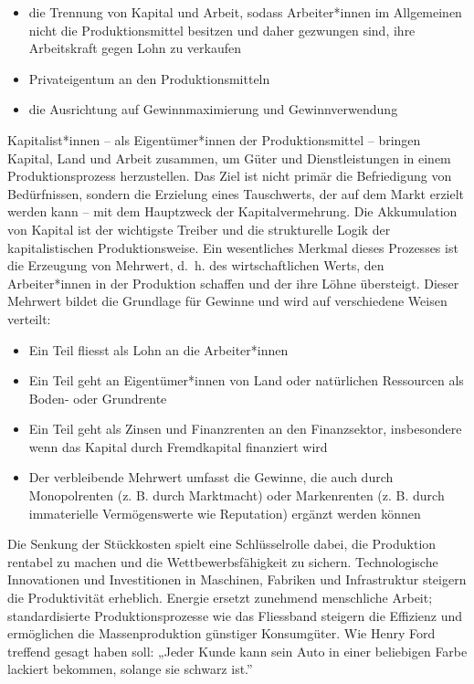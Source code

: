 \documentclass[
  nswissgerman,
  a4paper,
  openany]{book}
\begin{document}
\begin{itemize}
\item
  die Trennung von Kapital und Arbeit, sodass Arbeiter*innen im
  Allgemeinen nicht die Produktionsmittel besitzen und daher gezwungen
  sind, ihre Arbeitskraft gegen Lohn zu verkaufen
\item
  Privateigentum an den Produktionsmitteln
\item
  die Ausrichtung auf Gewinnmaximierung und Gewinnverwendung
\end{itemize}

Kapitalist*innen -- als Eigentümer*innen der Produktionsmittel --
bringen Kapital, Land und Arbeit zusammen, um Güter und Dienstleistungen
in einem Produktionsprozess herzustellen. Das Ziel ist nicht primär die
Befriedigung von Bedürfnissen, sondern die Erzielung eines Tauschwerts,
der auf dem Markt erzielt werden kann -- mit dem Hauptzweck der
Kapitalvermehrung. Die Akkumulation von Kapital ist der wichtigste
Treiber und die strukturelle Logik der kapitalistischen
Produktionsweise. Ein wesentliches Merkmal dieses Prozesses ist die
Erzeugung von Mehrwert, d.~h. des wirtschaftlichen Werts, den
Arbeiter*innen in der Produktion schaffen und der ihre Löhne übersteigt.
Dieser Mehrwert bildet die Grundlage für Gewinne und wird auf
verschiedene Weisen verteilt:

\begin{itemize}
\item
  Ein Teil fliesst als Lohn an die Arbeiter*innen
\item
  Ein Teil geht an Eigentümer*innen von Land oder natürlichen Ressourcen
  als Boden- oder Grundrente
\item
  Ein Teil geht als Zinsen und Finanzrenten an den Finanzsektor,
  insbesondere wenn das Kapital durch Fremdkapital finanziert wird
\item
  Der verbleibende Mehrwert umfasst die Gewinne, die auch durch
  Monopolrenten (z. B. durch Marktmacht) oder Markenrenten (z. B. durch
  immaterielle Vermögenswerte wie Reputation) ergänzt werden können
\end{itemize}

Die Senkung der Stückkosten spielt eine Schlüsselrolle dabei, die
Produktion rentabel zu machen und die Wettbewerbsfähigkeit zu sichern.
Technologische Innovationen und Investitionen in Maschinen, Fabriken und
Infrastruktur steigern die Produktivität erheblich. Energie ersetzt
zunehmend menschliche Arbeit; standardisierte Produktionsprozesse wie
das Fliessband steigern die Effizienz und ermöglichen die
Massenproduktion günstiger Konsumgüter. Wie Henry Ford treffend gesagt
haben soll: „Jeder Kunde kann sein Auto in einer beliebigen Farbe
lackiert bekommen, solange sie schwarz ist.''
\end{document}
